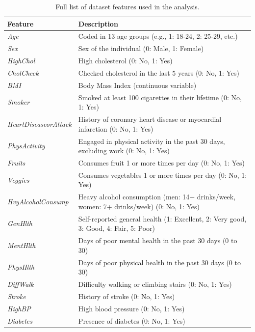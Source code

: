 \documentclass[a4paper,12pt]{article}
\begin{document}
\begin{table}[h!]
    \centering
    \begin{tabularx}{\textwidth}{|l|X|}
    \hline
    \textbf{Feature} & \textbf{Description} \\ \hline
    \textit{Age} & Coded in 13 age groups (e.g., 1: 18-24, 2: 25-29, etc.) \\ \hline
    \textit{Sex} & Sex of the individual (0: Male, 1: Female) \\ \hline
    \textit{HighChol} & High cholesterol (0: No, 1: Yes) \\ \hline
    \textit{CholCheck} & Checked cholesterol in the last 5 years (0: No, 1: Yes) \\ \hline
    \textit{BMI} & Body Mass Index (continuous variable) \\ \hline
    \textit{Smoker} & Smoked at least 100 cigarettes in their lifetime (0: No, 1: Yes) \\ \hline
    \textit{HeartDiseaseorAttack} & History of coronary heart disease or myocardial infarction (0: No, 1: Yes) \\ \hline
    \textit{PhysActivity} & Engaged in physical activity in the past 30 days, excluding work (0: No, 1: Yes) \\ \hline
    \textit{Fruits} & Consumes fruit 1 or more times per day (0: No, 1: Yes) \\ \hline
    \textit{Veggies} & Consumes vegetables 1 or more times per day (0: No, 1: Yes) \\ \hline
    \textit{HvyAlcoholConsump} & Heavy alcohol consumption (men: 14+ drinks/week, women: 7+ drinks/week) (0: No, 1: Yes) \\ \hline
    \textit{GenHlth} & Self-reported general health (1: Excellent, 2: Very good, 3: Good, 4: Fair, 5: Poor) \\ \hline
    \textit{MentHlth} & Days of poor mental health in the past 30 days (0 to 30) \\ \hline
    \textit{PhysHlth} & Days of poor physical health in the past 30 days (0 to 30) \\ \hline
    \textit{DiffWalk} & Difficulty walking or climbing stairs (0: No, 1: Yes) \\ \hline
    \textit{Stroke} & History of stroke (0: No, 1: Yes) \\ \hline
    \textit{HighBP} & High blood pressure (0: No, 1: Yes) \\ \hline
    \textit{Diabetes} & Presence of diabetes (0: No, 1: Yes) \\ \hline
    \end{tabularx}
    \caption{Full list of dataset features used in the analysis.}
    \label{tab:feature_list}
\end{table}

\printbibliography
\end{document}
